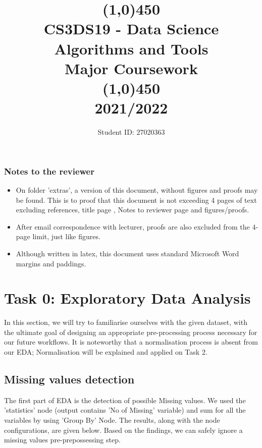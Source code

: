 \documentclass[11pt]{article}
\title{\line(1,0){450}\\ CS3DS19 - Data Science Algorithms and Tools \\ \large{Major Coursework }  \\\line(1,0){450} \\2021/2022}
\author{Student ID: 27020363}
\begin{document}
	\maketitle
	\pagebreak
	\subsubsection*{Notes to the reviewer}
		\begin{itemize}
			\item On folder 'extras', a version of this document, without figures and proofs may be found. This is to proof that this document is not exceeding 4 pages of text excluding references, title page , Notes to reviewer page and figures/proofs.
			\item After email correspondence with lecturer, proofs are also excluded from the 4-page limit, just like figures.
			\item Although written in latex, this document uses standard Microsoft Word margins and paddings.
		\end{itemize}
	\pagebreak
	\section*{Task 0: Exploratory Data Analysis}
		In this section, we will try to familiarise ourselves with the given dataset, with the ultimate goal of designing an appropriate pre-processing process necessary for our future workflows. It is noteworthy that a normalisation process is absent from our EDA; Normalisation will be explained and applied on Task 2.
		\subsection*{Missing values detection}
			The first part of EDA is the detection of possible Missing values. We used the 'statistics' node (output contains 'No of Missing' variable) and sum for all the variables by using 'Group By' Node. The results, along with the node configurations, are given below. Based on the findings, we can safely ignore a missing values pre-prepossessing step.

\end{document}
